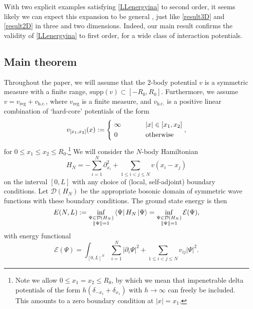 \documentclass[a4paper,11pt]{article}
\newcommand{\supp}{\text{supp}}
\newcommand{\abs}[1]{\left\lvert #1 \right\rvert}
\newcommand{\dom}[1]{\mathcal D\left(#1\right)}
\numberwithin{equation}{section}
\begin{document}
With two explicit examples satisfying \eqref{LLenergyina} to second order, it seems likely we can expect this expansion to be general \cite{astrakharchik2010low}, just like \eqref{result3D} and \eqref{result2D} in three and two dimensions. Indeed, our main result confirms the validity of \eqref{LLenergyina} to first order, for a wide class of interaction potentials.

\subsection{Main theorem}
\label{secMain}
Throughout the paper, we will assume that the 2-body potential $v$ is a symmetric measure with a finite range, $\supp(v)\subset[-R_0,R_0]$. Furthermore, we assume $ v=v_{\text{reg}}+v_{\text{h.c.}}$, where $ v_{\text{reg}}$ is a finite measure, and $ v_{\text{h.c.}} $ is a positive linear combination of `hard-core' potentials of the form 
\begin{equation}
v_{[x_1,x_2]}(x):=\begin{cases*}
\ \infty& \phantom{when} $|x|\in [x_1,x_2]$\\
\ 0 & \phantom{when} \text{otherwise}
\end{cases*},
\end{equation}
for $0\leq x_1\leq x_2\leq R_0$.\footnote{Note we allow $0\leq x_1=x_2\leq R_0$, by which we mean that impenetrable delta potentials of the form $h(\delta_{-x_1}+\delta_{x_1})$ with $h\to\infty$ can freely be included. This amounts to a zero boundary condition at $|x|=x_1$.}
We will consider the $N$-body Hamiltonian 
\begin{equation}
\label{H_N}
H_N=-\sum^N_{i=1}\partial^2_{x_i}+\sum_{1\leq i<j\leq N}v(x_i-x_j)
\end{equation}
on the interval $[0,L]$ with any choice of (local, self-adjoint) boundary conditions. Let $\dom{H_N}$ be the appropriate bosonic domain of symmetric wave functions with these boundary conditions. The ground state energy is then
\begin{equation}
\label{vari}
E(N,L):=\inf_{\substack{\Psi\in\dom{H_N}\\\|\Psi\|=1}}\bra{\Psi}H_N\ket{\Psi}=\inf_{\substack{\Psi\in\dom{H_N}\\\|\Psi\|=1}}\mathcal{E}(\Psi),
\end{equation}
with energy functional
\begin{equation}
\label{enfunctional}
\mathcal{E}(\Psi)=\int_{[0,L]^N}\sum_{i=1}^{N}\abs{\partial_i\Psi}^2+\sum_{1\leq i<j\leq N}v_{ij}\abs{\Psi}^2.
\end{equation}
\end{document}
